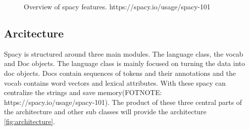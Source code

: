 \begin{figure}[h]
    \caption{Overview of spacy features. https://spacy.io/usage/spacy-101}
    \label{fig:features}
\end{figure}

\subsection{Arcitecture}\label{sec:architecture}


Spacy is structured around three main modules.
The language class, the vocab and Doc objects.
The language class is mainly focused on turning the data into doc objects.
Docs contain sequences of tokens and their annotations and the vocab contains word vectors and lexical attributes.
With these spacy can centralize the strings and save memory(FOTNOTE: https://spacy.io/usage/spacy-101).
The product of these three central parts of the architecture and other sub classes will provide the architecture \ref{fig:architecture}.


